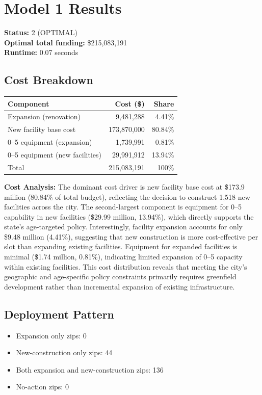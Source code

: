 \documentclass[12pt]{article}
\begin{document}
\section{Model 1 Results}
\textbf{Status:} 2 (OPTIMAL) \\
\textbf{Optimal total funding:} \$215,083,191 \\
\textbf{Runtime:} 0.07 seconds

\subsection{Cost Breakdown}
\begin{table}[h]
\centering
\begin{tabular}{@{}lrr@{}}
\toprule
Component & Cost (\$) & Share \\
\midrule
Expansion (renovation) & 9,481,288 & 4.41\% \\
New facility base cost & 173,870,000 & 80.84\% \\
0--5 equipment (expansion) & 1,739,991 & 0.81\% \\
0--5 equipment (new facilities) & 29,991,912 & 13.94\% \\
\midrule
Total & 215,083,191 & 100\% \\
\bottomrule
\end{tabular}
\end{table}

\noindent\textbf{Cost Analysis:} The dominant cost driver is new facility base cost at \$173.9 million (80.84\% of total budget), reflecting the decision to construct 1,518 new facilities across the city. The second-largest component is equipment for 0--5 capability in new facilities (\$29.99 million, 13.94\%), which directly supports the state's age-targeted policy. Interestingly, facility expansion accounts for only \$9.48 million (4.41\%), suggesting that new construction is more cost-effective per slot than expanding existing facilities. Equipment for expanded facilities is minimal (\$1.74 million, 0.81\%), indicating limited expansion of 0--5 capacity within existing facilities. This cost distribution reveals that meeting the city's geographic and age-specific policy constraints primarily requires greenfield development rather than incremental expansion of existing infrastructure.

\subsection{Deployment Pattern}
\begin{itemize}
    \item Expansion only zips: 0
    \item New-construction only zips: 44
    \item Both expansion and new-construction zips: 136
    \item No-action zips: 0
\end{itemize}
\end{document}
